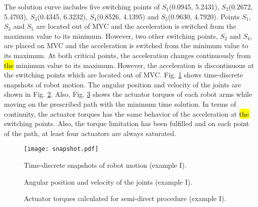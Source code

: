 \documentclass{rob}%
\begin{document}
The solution curve includes five switching points of $ S_1 $(0.0945, 5.2431), $ S_2 $(0.2672, 5.4703), $ S_3 $(0.4345, 6.3232), $ S_4 $(0.8526, 4.1395) and $ S_5 $(0.9630, 4.7920). Points $ S_1 $, $ S_3 $ and $ S_5 $ are located out of MVC and the acceleration is switched from the maximum value to its minimum. However, two other switching points, $ S_2 $ and $ S_4 $, are placed on MVC and the acceleration is switched from the minimum value to its maximum. 
At both critical points, the acceleration changes continuously from \hl{the} minimum value to its maximum. However, the acceleration is discontinuous at the switching points which are located out of MVC.
Fig. \ref{fig:snapshot} shows time-discrete snapshots of robot motion. The angular position and velocity of the joints are shown in Fig. \ref{fig:theta_dtheta}.
Also, Fig. \ref{fig:tau_manp1} shows the actuator torques of each robot arms while moving on the prescribed path with the minimum time solution. In terms of continuity, the actuator torques has the same behavior of the acceleration at \hl{the} switching points.
Also, the torque limitation has been fulfilled and on each point of the path, at least four actuators are always saturated.

\begin{figure}[!t]
	\centering
	\texttt{[image: snapshot.pdf]}
	\caption{Time-discrete snapshots of robot motion (example I).}
	\label{fig:snapshot}
\end{figure}

\begin{figure}[!t]
	\centering
	\hfil
	\caption{Angular position and velocity of the joints (example I).}
	\label{fig:theta_dtheta}
\end{figure}

\begin{figure}[!t]
	\centering
	\hfil
	\caption{Actuator torques calculated for semi-direct procedure (example I).}
	\label{fig:tau_manp1}
\end{figure}
\end{document}
